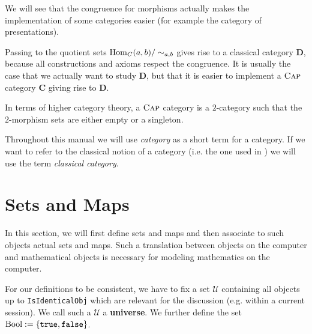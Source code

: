 We will see that the congruence for morphisms actually makes the implementation of some categories easier (for example
the category of presentations).

\begin{remark}
 Passing to the quotient sets $\operatorname{\mathrm{Hom}}_{C}( a, b )/\sim_{a,b}$ gives rise to a classical category $\mathbf{D}$, because
 all constructions and axioms respect the congruence.
 It is usually the case that we actually want to study $\mathbf{D}$, but that it is easier to implement a $\textsc{Cap}$ category $\mathbf{C}$
 giving rise to $\mathbf{D}$.
\end{remark}

\begin{remark}
 In terms of higher category theory, a $\textsc{Cap}$ category is a $2$-category such that the $2$-morphism sets are either empty or a singleton.
\end{remark}

\begin{convention}
 Throughout this manual we will use \textit{category} as a short term for a \CapPkg category. 
 If we want to refer to the classical notion of a category (i.e. the one used in \cite{MLCWM}) we will use the term \textit{classical category}.
\end{convention}

\section{\GAP Sets and \GAP Maps}\label{section:gap_sets}

In this section, we will first define \GAP sets and \GAP maps and
then associate to such objects actual sets and maps. 
Such a translation between objects on the computer and mathematical objects
is necessary for modeling mathematics on the computer.

\begin{remark}
 For our definitions to be consistent, we have to fix
 a set $\mathcal{U}$ containing all \GAP objects up to \texttt{IsIdenticalObj}
 which are relevant for the discussion (e.g. within a current session). 
 We call such a $\mathcal{U}$ a \textbf{\GAP universe}.
 We further define the set $\mathrm{Bool} := \{ \texttt{true}, \texttt{false} \}$.
\end{remark}


